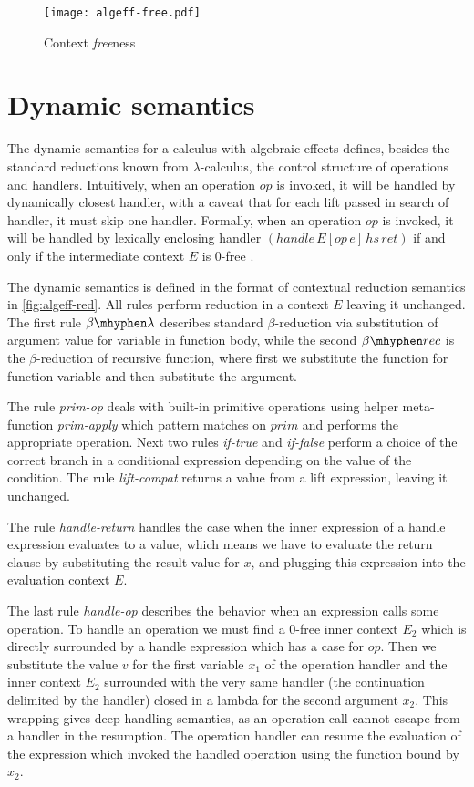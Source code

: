 \documentclass[inz, english, shortabstract]{iithesis}
\newcommand{\LC}{\(\lambda\)-calculus}
\begin{document}
\begin{figure}
  \centering
  \texttt{[image: algeff-free.pdf]}
  \caption{Context \emph{free}ness}
  \label{fig:algeff-free}  
\end{figure}

\section{Dynamic semantics}
The dynamic semantics for a calculus with algebraic effects defines, besides the standard reductions known from \LC{}, the control structure of operations and handlers.
Intuitively, when an operation $op$ is invoked, it will be handled by dynamically closest handler, with a caveat that for each lift passed in search of handler, it must skip one handler.
Formally, when an operation $ op $ is invoked, it will be handled by lexically enclosing handler $ (handle \, E[op \, e] \, hs \, ret) $ if and only if the intermediate context $ E $ is $0$-free \cite{Biernacki2017}.

The dynamic semantics is defined in the format of contextual reduction semantics in \autoref{fig:algeff-red}.
All rules perform reduction in a context $ E $ leaving it unchanged.
The first rule $\beta\mhyphen\lambda$ describes standard $ \beta $-reduction via substitution of argument value for variable in function body, while the second $\beta\mhyphen rec$ is the $ \beta $-reduction of recursive function, where first we substitute the function for function variable and then substitute the argument.

The rule \emph{prim-op} deals with built-in primitive operations using helper meta-function \textit{prim-apply} which pattern matches on $prim$ and performs the appropriate operation.
Next two rules \emph{if-true} and \emph{if-false} perform a choice of the correct branch in a conditional expression depending on the value of the condition.
The rule \emph{lift-compat} returns a value from a lift expression, leaving it unchanged.

The rule \textit{handle-return} handles the case when the inner expression of a handle expression evaluates to a value, which means we have to evaluate the return clause by substituting the result value for $ x $, and plugging this expression into the evaluation context $ E $.

The last rule \textit{handle-op} describes the behavior when an expression calls some operation.
To handle an operation we must find a $0$-free inner context $ E_2 $ which is directly surrounded by a handle expression which has a case for $ op $.
Then we substitute the value $ v $ for the first variable $x_1$ of the operation handler and the inner context $ E_2 $ surrounded with the very same handler (the continuation delimited by the handler) closed in a lambda for the second argument $x_2$.
This wrapping gives deep handling semantics, as an operation call cannot escape from a handler in the resumption.
The operation handler can resume the evaluation of the expression which invoked the handled operation using the function bound by $x_2$.
\end{document}
